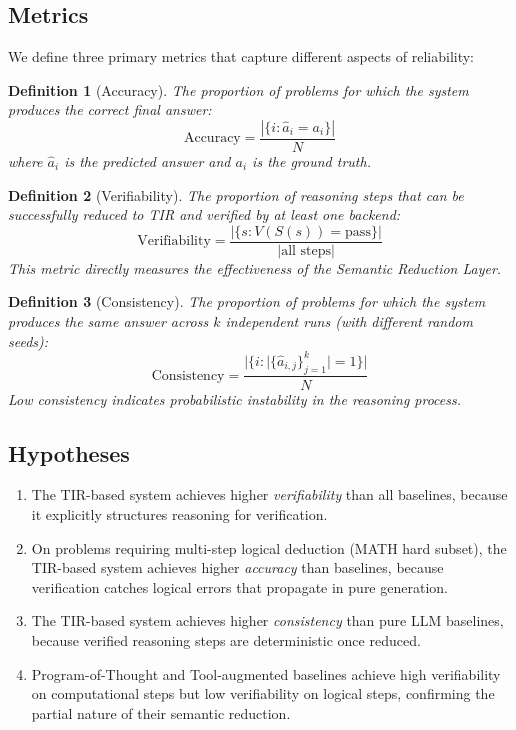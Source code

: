 \documentclass[11pt,a4paper]{article}
\newtheorem{definition}{Definition}
\begin{document}
\subsection{Metrics}

We define three primary metrics that capture different aspects of reliability:

\begin{definition}[Accuracy]
The proportion of problems for which the system produces the correct final answer:
\begin{equation}
\text{Accuracy} = \frac{|\{i : \hat{a}_i = a_i\}|}{N}
\end{equation}
where $\hat{a}_i$ is the predicted answer and $a_i$ is the ground truth.
\end{definition}

\begin{definition}[Verifiability]
The proportion of reasoning steps that can be successfully reduced to TIR and verified by at least one backend:
\begin{equation}
\text{Verifiability} = \frac{|\{s : V(S(s)) = \text{pass}\}|}{|\text{all steps}|}
\end{equation}
This metric directly measures the effectiveness of the Semantic Reduction Layer.
\end{definition}

\begin{definition}[Consistency]
The proportion of problems for which the system produces the same answer across $k$ independent runs (with different random seeds):
\begin{equation}
\text{Consistency} = \frac{|\{i : |\{\hat{a}_{i,j}\}_{j=1}^k| = 1\}|}{N}
\end{equation}
Low consistency indicates probabilistic instability in the reasoning process.
\end{definition}

\subsection{Hypotheses}

\begin{enumerate}[leftmargin=*,label=\textbf{H\arabic*}]
    \item The TIR-based system achieves higher \textit{verifiability} than all baselines, because it explicitly structures reasoning for verification.
    \item On problems requiring multi-step logical deduction (MATH hard subset), the TIR-based system achieves higher \textit{accuracy} than baselines, because verification catches logical errors that propagate in pure generation.
    \item The TIR-based system achieves higher \textit{consistency} than pure LLM baselines, because verified reasoning steps are deterministic once reduced.
    \item Program-of-Thought and Tool-augmented baselines achieve high verifiability on computational steps but low verifiability on logical steps, confirming the partial nature of their semantic reduction.
\end{enumerate}
\end{document}
